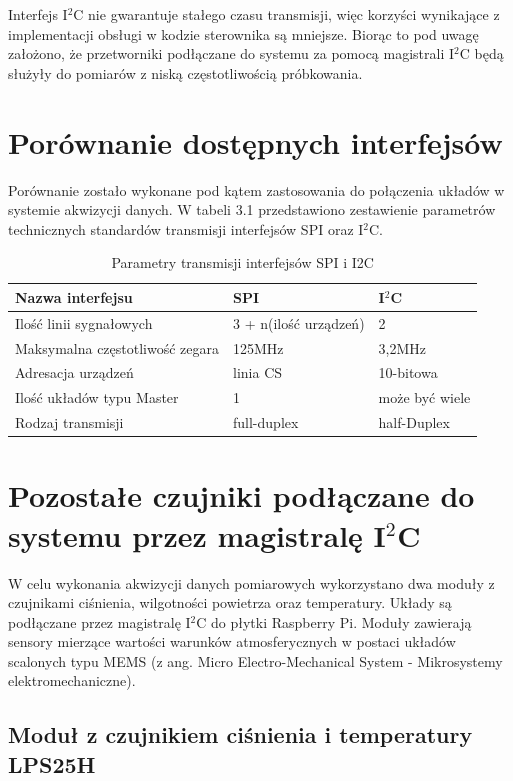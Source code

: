 Interfejs I$^2$C nie gwarantuje stałego czasu transmisji, więc korzyści wynikające z implementacji obsługi w kodzie sterownika są mniejsze. Biorąc to pod uwagę założono, że przetworniki podłączane do systemu za pomocą magistrali I$^2$C będą służyły do pomiarów z niską częstotliwością próbkowania.

\section{Porównanie dostępnych interfejsów}

Porównanie zostało wykonane pod kątem zastosowania do połączenia układów w systemie akwizycji danych. W tabeli 3.1 przedstawiono zestawienie parametrów technicznych standardów transmisji interfejsów SPI oraz I$^2$C. 


\begin{table}[!ht]
\label{tab3.2}
\begin{tabular}{|l|l|l|}
  \hline 
  Nazwa interfejsu & SPI & I$^2$C\\
  \hline
  Ilość linii sygnałowych & 3 + n(ilość urządzeń)  & 2 \\
  \hline  
  Maksymalna częstotliwość zegara & 125MHz  & 3,2MHz \\
  \hline
  Adresacja urządzeń & linia CS & 10-bitowa  \\
  \hline
  Ilość układów typu Master & 1 & może być wiele\\
  \hline
  Rodzaj transmisji & full-duplex & half-Duplex\\
  \hline
  
\end{tabular}
\caption{Parametry transmisji interfejsów SPI i I2C} 
\end{table}

\section{Pozostałe czujniki podłączane do systemu przez magistralę I$^2$C}

W celu wykonania akwizycji danych pomiarowych wykorzystano dwa moduły z czujnikami ciśnienia, wilgotności powietrza oraz temperatury. Układy są  podłączane przez magistralę I$^2$C do płytki Raspberry Pi. Moduły zawierają sensory mierzące wartości warunków atmosferycznych w postaci układów scalonych typu MEMS (z ang. Micro Electro-Mechanical System - Mikrosystemy elektromechaniczne).

\subsection{Moduł z czujnikiem ciśnienia i temperatury LPS25H}

